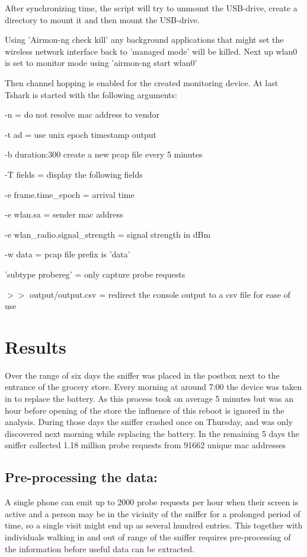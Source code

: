 \documentclass[conference,compsoc]{IEEEtran}
\begin{document}
After synchronizing time, the script will try to unmount the USB-drive, create a directory to mount it and then mount the USB-drive.

Using 'Airmon-ng check kill' any background applications that might set the wireless network interface back to 'managed mode' will be killed.
Next up wlan0 is set to monitor mode using 'airmon-ng start wlan0'

Then channel hopping is enabled for the created monitoring device.
At last Tshark is started with the following arguments:

-n = do not resolve mac address to vendor

-t ad = use unix epoch timestamp output

-b duration:300 create a new pcap file every 5 minutes

-T fields = display the following fields

-e frame.time\_epoch = arrival time

-e wlan.sa = sender mac address

-e wlan\_radio.signal\_strength = signal strength in dBm

-w data = pcap file prefix is 'data'

'subtype probereg' = only capture probe requests

$>>$ output/output.csv = redirect the console output to a csv file for ease of use


\section{Results}
Over the range of six days the sniffer was placed in the postbox next to the entrance of the grocery store. Every morning at around 7:00 the device was taken in to replace the battery. As this process took on average 5 minutes but was an hour before opening of the store the influence of this reboot is ignored in the analysis. During those days the sniffer crashed once on Thursday, and was only discovered next morning while replacing the battery. In the remaining 5 days the sniffer collected 1.18 million probe requests from 91662 unique mac addresses


\subsection{Pre-processing the data:}
A single phone can emit up to 2000 probe requests per hour when their screen is active\cite{ProbeFrequency} and a person may be in the vicinity of the sniffer for a prolonged period of time, so a single visit might end up as several hundred entries. This together with individuals walking in and out of range of the sniffer requires pre-processing of the information before useful data can be extracted. 
\end{document}

